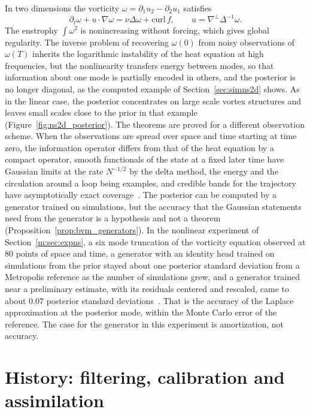 In two dimensions the vorticity $\omega = \partial_1u_2-\partial_2u_1$ satisfies
\[
\partial_t\omega+u\cdot\nabla\omega = \nu\Delta\omega+\mathrm{curl}\,f,\qquad u = \nabla^\perp\Delta^{-1}\omega.
\]
The enstrophy $\int\omega^2$ is nonincreasing without forcing, which gives global regularity. The inverse problem of recovering $\omega(0)$ from noisy observations of $\omega(T)$ inherits the logarithmic instability of the heat equation at high frequencies, but the nonlinearity transfers energy between modes, so that information about one mode is partially encoded in others, and the posterior is no longer diagonal, as the computed example of Section~\ref{sec:simns2d} shows. As in the linear case, the posterior concentrates on large scale vortex structures and leaves small scales close to the prior in that example (Figure~\ref{fig:ns2d_posterior}). The theorems are proved for a different observation scheme. When the observations are spread over space and time starting at time zero, the information operator differs from that of the heat equation by a compact operator, smooth functionals of the state at a fixed later time have Gaussian limits at the rate $N^{-1/2}$ by the delta method, the energy and the circulation around a loop being examples, and credible bands for the trajectory have asymptotically exact coverage~\cite{konennickl2026}. The posterior can be computed by a generator trained on simulations, but the accuracy that the Gaussian statements need from the generator is a hypothesis and not a theorem (Proposition~\ref{prop:bvm_generators}). In the nonlinear experiment of Section~\ref{m:sec:expns}, a six mode truncation of the vorticity equation observed at $80$ points of space and time, a generator with an identity head trained on simulations from the prior stayed about one posterior standard deviation from a Metropolis reference as the number of simulations grew, and a generator trained near a preliminary estimate, with its residuals centered and rescaled, came to about $0.07$ posterior standard deviations~\cite{polsonsokolov2026manifold}. That is the accuracy of the Laplace approximation at the posterior mode, within the Monte Carlo error of the reference. The case for the generator in this experiment is amortization, not accuracy.

\section{History: filtering, calibration and assimilation}

